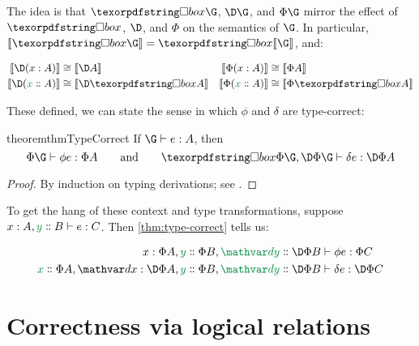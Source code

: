 \noindent
The idea is that $\iso\G$, $\D\G$, and $\Phi\G$ mirror the effect of $\iso$,
$\D$, and $\Phi$ on the semantics of $\G$. In particular, $\den{\iso\G} =
\iso{\den\G}$, and:

\nopagebreak[2]
\begin{align*}
  \den{\D(\h x A)} &\cong \den{\D A}
  &
  \den{\Phi(\h x A)} &\cong \den{\Phi A}
  \\
  \den{\D(\hd x A)} &\cong \den{\D \iso A}
  &
  \den{\Phi(\hd x A)} &\cong \den{\Phi \iso A}
\end{align*}

\noindent
These defined, we can state the sense in which $\phi$ and $\delta$ are
type-correct:

\begin{restatable}{theorem}{thmTypeCorrect}
  \label{thm:type-correct}
  If $\J e \G A$, then
  \[ \J {\phi e} {\Phi\G} {\Phi A}
  \qquad\text{and}\qquad
  \J {\delta e} {\iso{\Phi\G}, \DP\G} {\DP A}
  \]
\end{restatable}
\begin{proof}
  By induction on typing derivations; see \XXX. %
\end{proof}

\noindent To get the hang of these context and type transformations, suppose $\J
e {\h x A, \hd y B} C$. Then \cref{thm:type-correct} tells us:

\nopagebreak[2]
\begin{align*}
  \Jalign {\phi e} {\h x {\Phi A}, \hd y {\Phi B}, \hd \dy {\DP B}} {\Phi C}
  \\
  \Jalign {\delta e} {\hd x {\Phi A}, \h\dx{\DP A}, \hd y {\Phi B}, \hd \dy {\DP B}} {\DP C}
\end{align*}


\section{Correctness via logical relations}
\label{sec:logical-relations}



%




